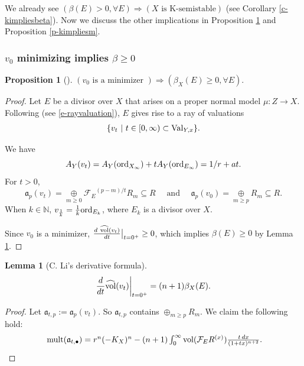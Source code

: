 \documentclass[12pt,reqno]{amsart}%
\newcommand{\cF}{\mathcal{F}}
\newcommand{\mult}{{\rm mult}}
\newcommand{\ord}{{\rm ord}}
\newtheorem{lem}[thm]{Lemma}
\newtheorem{prop}[thm]{Proposition}
\theoremstyle{definition}
\theoremstyle{remark}
\newcommand{\Val}{{\rm Val}}
\newcommand{\vol}{{\rm vol}}
\newcommand{\hvol}{\widehat{\rm vol}}
\newcommand{\fa}{{\mathfrak{a}}}
\begin{document}
\begin{subappendices}
We already see $(\beta(E)>0, \forall E)\Longrightarrow (X\mbox{ is K-semistable})$ (see Corollary \ref{c-kimpliesbeta}). Now we discuss the other implications in Proposition \ref{p-mimpliesbeta} and Proposition \ref{p-kimpliesm}. 

\subsubsection*{$v_0$ minimizing implies $\beta\ge 0$}

\begin{prop}[{\cite{Li17}}]\label{p-mimpliesbeta}
$(\mbox{$v_0$ is a minimizer })\Longrightarrow(\beta_X(E)\ge 0, \forall E).$
\end{prop}
\begin{proof}
 Let $E$ be a divisor over $X$ that arises on a proper normal model $\mu:Z\to X$. Following  \cite{Li17,LX20} (see \eqref{e-rayvaluation}), $E$ gives rise to a ray of valuations 
\begin{eqnarray}\label{e-ray}
\{v_{t}\ |\  t\in [0,\infty) \subset \Val_{Y,x}\}.
\end{eqnarray}

  
We have
  \[
  A_{Y} (v_t) =   A_{Y} (\ord_{X_\infty}) + tA_{Y} (\ord_{E_\infty}) = 1/r + at 
  .\]
For $t>0$, 
  \[ \fa_p(v_t) = \underset{m\geq 0 }{\oplus} {\cF_E}^{(p-m)/t}R_m \subseteq R \quad
  \text{ and } 
  \quad
   \fa_p(v_0) = \underset{m\geq p } {\oplus} R_m  \subseteq R
  .\] 
When $k\in \mathbb{N}$, $v_{\frac{1}{k}}=\frac{1}{k}\ord_{E_k}$, where $E_k$ is a divisor over $X$. 

Since $ v_0$ is a minimizer,  $\frac{d \  \hvol(v_t)}{dt}\big\vert_{t=0^+}\ge 0$, which implies $\beta(E)\ge 0$ by Lemma \ref{l-dervolume}.
\end{proof}




\begin{lem}[C. Li's derivative formula]\label{l-dervolume}
\begin{eqnarray}\label{e-betader}
\frac{d }{dt} \hvol(v_t)\bigg\vert_{t=0^+} = (n+1) \beta_{X}(E).
\end{eqnarray}
\end{lem}
\begin{proof}
Let $\fa_{t,p}:=\fa_p(v_t)$. So $\fa_{t,p}$ contains $ \oplus_{m\geq p} R_m$. We claim the following hold:
\begin{eqnarray}\label{e-volume}
\mbox{ $\mult(\fa_{t,\bullet}) =  r^n (-K_X)^n - (n+1) \int_{0}^{\infty} \vol (\cF_E R^{(x)}) \frac{ t\, dx}{(1+tx)^{n+2}}$}.
\end{eqnarray}



\end{proof}
\end{subappendices}
\end{document}
